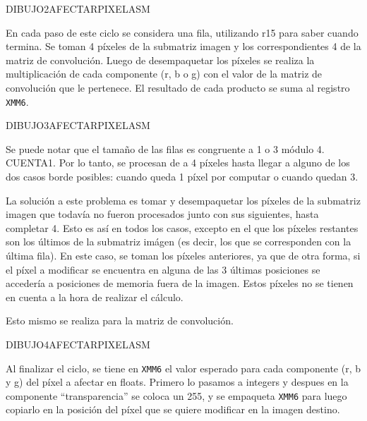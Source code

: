         DIBUJO2AFECTARPIXELASM
  
        En cada paso de este ciclo se considera una fila, utilizando r15 para saber cuando termina. Se toman 4 píxeles de la submatriz imagen y los correspondientes 4 de la matriz de convolución. Luego de desempaquetar los píxeles se realiza la multiplicación de cada componente (r, b o g) con el valor de la matriz de convolución que le pertenece. El resultado de cada producto se suma al registro \texttt{XMM6}. 

        DIBUJO3AFECTARPIXELASM  

        Se puede notar que el tamaño de las filas es congruente a 1 o 3 módulo 4. 
        CUENTA1. Por lo tanto, se procesan de a 4 píxeles hasta llegar a alguno de los dos casos borde posibles: cuando queda 1 píxel por computar o cuando quedan 3. 
        
        La solución a este problema es tomar y desempaquetar los píxeles de la submatriz imagen que todavía no fueron procesados junto con sus siguientes, hasta completar 4. Esto es así en todos los casos, excepto en el que los píxeles restantes son los últimos de la submatriz imágen (es decir, los que se corresponden con la última fila). En este caso, se toman los píxeles anteriores, ya que de otra forma, si el píxel a modificar se encuentra en alguna de las 3 últimas posiciones se accedería a posiciones de memoria fuera de la imagen. Estos píxeles no se tienen en cuenta a la hora de realizar el cálculo. 
          
        Esto mismo se realiza para la matriz de convolución.
          
        DIBUJO4AFECTARPIXELASM

        Al finalizar el ciclo, se tiene en \texttt{XMM6} el valor esperado para cada componente (r, b y g) del píxel a afectar en floats. Primero lo pasamos a integers y despues en la componente “transparencia” se coloca un 255, y se empaqueta \texttt{XMM6} para luego copiarlo en la posición del píxel que se quiere modificar en la imagen destino. 